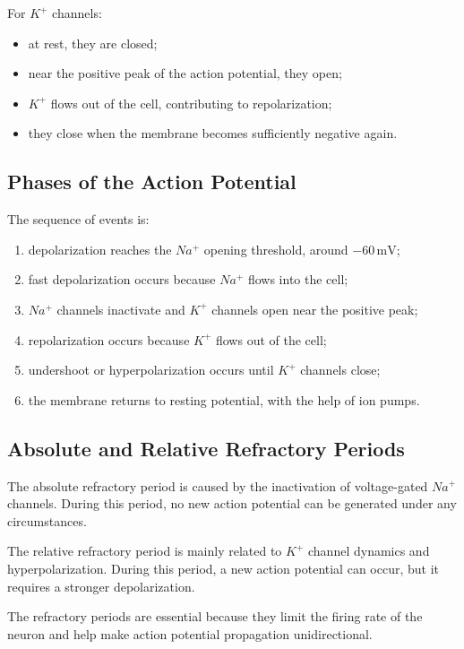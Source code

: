 For $K^+$ channels:

\begin{itemize}[noitemsep]
    \item at rest, they are closed;
    \item near the positive peak of the action potential, they open;
    \item $K^+$ flows out of the cell, contributing to repolarization;
    \item they close when the membrane becomes sufficiently negative again.
\end{itemize}

\subsection{Phases of the Action Potential}

The sequence of events is:

\begin{enumerate}[noitemsep]
    \item depolarization reaches the $Na^+$ opening threshold, around $-60\,\text{mV}$;
    \item fast depolarization occurs because $Na^+$ flows into the cell;
    \item $Na^+$ channels inactivate and $K^+$ channels open near the positive peak;
    \item repolarization occurs because $K^+$ flows out of the cell;
    \item undershoot or hyperpolarization occurs until $K^+$ channels close;
    \item the membrane returns to resting potential, with the help of ion pumps.
\end{enumerate}

\subsection{Absolute and Relative Refractory Periods}

The absolute refractory period is caused by the inactivation of voltage-gated $Na^+$ channels. During this period, no new action potential can be generated under any circumstances.

The relative refractory period is mainly related to $K^+$ channel dynamics and hyperpolarization. During this period, a new action potential can occur, but it requires a stronger depolarization.

\begin{authornote}
The refractory periods are essential because they limit the firing rate of the neuron and help make action potential propagation unidirectional.
\end{authornote}

